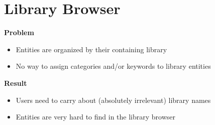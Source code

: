 \section{Library Browser}

\begin{frame}{\secname}
  \textbf{Problem}
  \begin{itemize}
    \item Entities are organized by their containing library
    \item No way to assign categories and/or keywords to library entities
  \end{itemize}

  \pause

  \textbf{Result}
  \begin{itemize}
    \item Users need to carry about (absolutely irrelevant) library names
    \item Entities are very hard to find in the library browser
  \end{itemize}
\end{frame}

